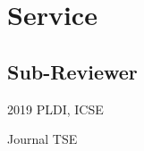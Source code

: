\documentclass[12pt,letterpaper]{report}
\newcommand{\listitemspace}{0.15em}
\renewenvironment{itemize}
{\begin{list}{}{\setlength{\leftmargin}{0em}
			\setlength{\parskip}{0em}
			\setlength{\itemsep}{\listitemspace}
			\setlength{\parsep}{\listitemspace}}}
	{\end{list}}
\begin{document}
%	
%	
%		
%		
%		
%		
%	
%	
%		
%		
%	
%	
%		
%		
	
	
	\section*{Service}
	
	\subsection*{Sub-Reviewer}
	\begin{tablist}
		\item[2019] \tab PLDI, ICSE
		\item[Journal] \tab TSE
	\end{tablist}
	
\end{document}
